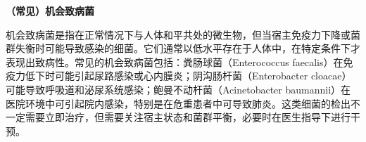 \documentclass[UTF8]{ctexart}
\begin{document}
\newpage

\begin{tcolorbox}[
    enhanced,
    colback=white,
    colframe=white,
    arc=2mm,
    boxrule=0pt,
    width=\textwidth,
    left=15pt,
    right=15pt,
    top=10pt,
    bottom=10pt,
    drop shadow={
        opacity=0.2,
        color=customTeal
    },
    borderline west={5pt}{0pt}{customTeal}
]
\textcolor{customTeal}{\large\textbf{（常见）机会致病菌}}
\end{tcolorbox}

\begin{tcolorbox}[
    enhanced,
    colback=customTealBg,
    colframe=customTealBg,
    arc=3mm,
    boxrule=0pt,
    width=\textwidth,
    top=8pt,
    bottom=8pt
]
{\small{\color{customTeal}\faInfoCircle} 机会致病菌是指在正常情况下与人体和平共处的微生物，但当宿主免疫力下降或菌群失衡时可能导致感染的细菌。它们通常以低水平存在于人体中，在特定条件下才表现出致病性。常见的机会致病菌包括：粪肠球菌（Enterococcus faecalis）在免疫力低下时可能引起尿路感染或心内膜炎；阴沟肠杆菌（Enterobacter cloacae）可能导致呼吸道和泌尿系统感染；鲍曼不动杆菌（Acinetobacter baumannii）在医院环境中可引起院内感染，特别是在危重患者中可导致肺炎。这类细菌的检出不一定需要立即治疗，但需要关注宿主状态和菌群平衡，必要时在医生指导下进行干预。
}
\end{tcolorbox}

\newpage
\end{document}

